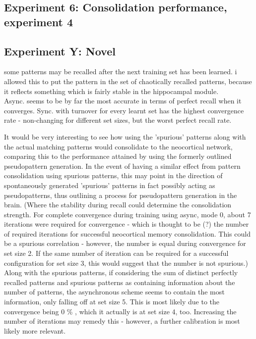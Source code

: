 \subsection{Experiment 6: Consolidation performance, experiment 4}

\subsection{Experiment Y: Novel}

some patterns may be recalled after the next training set has been learned. i allowed this to put the pattern in the set of chaotically recalled patterns, because it reflects something which is fairly stable in the hippocampal module.
\\

Async. seems to be by far the most accurate in terms of perfect recall when it converges. Sync. with turnover for every learnt set has the highest convergence rate - non-changing for different set sizes, but the worst perfect recall rate.

It would be very interesting to see how using the 'spurious' patterns along with the actual matching patterns would consolidate to the neocortical network, comparing this to the performance attained by using the formerly outlined pseudopattern generation. In the event of having a similar effect from pattern consolidation using spurious patterns, this may point in the direction of spontaneously generated 'spurious' patterns in fact possibly acting as pseudopatterns, thus outlining a process for pseudopattern generation in the brain. (Where the stability during recall could determine the consolidation strength. For complete convergence during training using async, mode 0, about 7 iterations were required for convergence - which is thought to be (?) the number of required iterations for successful neocortical memory consolidation. This could be a spurious correlation - however, the number is equal during convergence for set size 2. If the same number of iteration can be required for a successful configuration for set size 3, this would suggest that the number is not spurious.)
\\

Along with the spurious patterns, if considering the sum of distinct perfectly recalled patterns and spurious patterns as containing information about the number of patterns, the asynchronous scheme seems to contain the most information, only falling off at set size 5. This is most likely due to the convergence being 0 \% , which it actually is at set size 4, too. Increasing the number of iterations may remedy this - however, a further calibration is most likely more relevant.
\\

